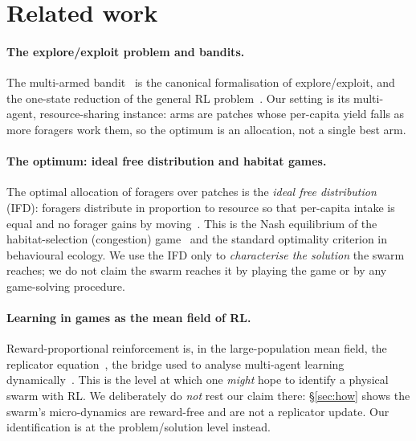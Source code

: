 \documentclass{article}
\begin{document}
\section{Related work}
\label{sec:related}
\paragraph{The explore/exploit problem and bandits.} The multi-armed bandit~\citep{robbins1952bandit,
lattimore2020bandit} is the canonical formalisation of explore/exploit, and the one-state reduction of the
general RL problem~\citep{SuttonBarto2018}. Our setting is its multi-agent, resource-sharing instance: arms are
patches whose per-capita yield falls as more foragers work them, so the optimum is an allocation, not a single
best arm.

\paragraph{The optimum: ideal free distribution and habitat games.} The optimal allocation of foragers over
patches is the \emph{ideal free distribution} (IFD): foragers distribute in proportion to resource so that
per-capita intake is equal and no forager gains by moving~\citep{fretwell1969ideal}. This is the Nash
equilibrium of the habitat-selection (congestion) game~\citep{rosenthal1973congestion,wardrop1952road} and the
standard optimality criterion in behavioural ecology. We use the IFD only to \emph{characterise the solution}
the swarm reaches; we do not claim the swarm reaches it by playing the game or by any game-solving procedure.

\paragraph{Learning in games as the mean field of RL.} Reward-proportional reinforcement is, in the
large-population mean field, the replicator equation~\citep{borgers1997learning}, the bridge used to analyse
multi-agent learning dynamically~\citep{hofbauer1998evolutionary,sandholm2010population,tuyls2005evolutionary,
bloembergen2015evolutionary}. This is the level at which one \emph{might} hope to identify a physical swarm
with RL. We deliberately do \emph{not} rest our claim there: \S\ref{sec:how} shows the swarm's micro-dynamics
are reward-free and are not a replicator update. Our identification is at the problem/solution level instead.
\end{document}
